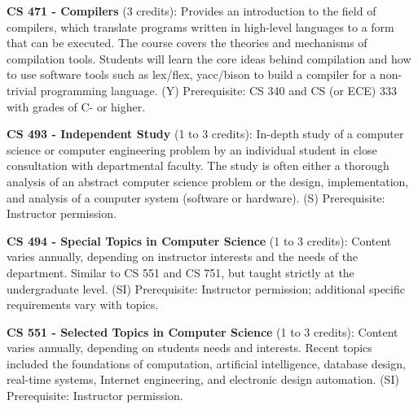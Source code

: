 \documentclass[12pt,twoside]{article}
\begin{document}
{\bf\noindent CS 471 - Compilers} (3 credits): Provides an
introduction to the field of compilers, which translate programs
written in high-level languages to a form that can be executed. The
course covers the theories and mechanisms of compilation
tools. Students will learn the core ideas behind compilation and how
to use software tools such as lex/flex, yacc/bison to build a compiler
for a non-trivial programming language. (Y) Prerequisite: CS 340 and
CS (or ECE) 333 with grades of C- or higher.

{\bf\noindent CS 493 - Independent Study} (1 to 3 credits): In-depth
study of a computer science or computer engineering problem by an
individual student in close consultation with departmental
faculty. The study is often either a thorough analysis of an abstract
computer science problem or the design, implementation, and analysis
of a computer system (software or hardware). (S) Prerequisite:
Instructor permission.

{\bf\noindent CS 494 - Special Topics in Computer Science} (1 to 3
credits): Content varies annually, depending on instructor interests
and the needs of the department. Similar to CS 551 and CS 751, but
taught strictly at the undergraduate level. (SI) Prerequisite:
Instructor permission; additional specific requirements vary with
topics.

{\bf\noindent CS 551 - Selected Topics in Computer Science} (1 to 3
credits): Content varies annually, depending on students needs
and interests. Recent topics included the foundations of computation,
artificial intelligence, database design, real-time systems, Internet
engineering, and electronic design automation. (SI) Prerequisite:
Instructor permission.



\end{document}
